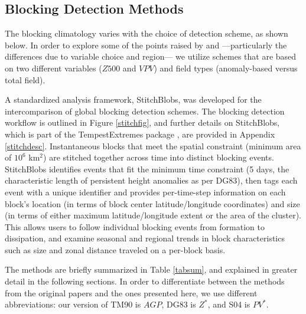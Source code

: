 \documentclass[smallextended]{svjour3}       %
\numberwithin{equation}{section}
\begin{document}
\subsection{Blocking Detection Methods}\label{detectionmethods}


The blocking climatology varies with the choice of detection scheme, as shown below. In order to explore some of the points raised by \cite{davini_bidimensional_2012} and \cite{scherrer_two-dimensional_2006}---particularly the differences due to variable choice and region--- we utilize schemes that are based on two different variables ($Z500$ and $VPV$) and field types (anomaly-based versus total field). 

A standardized analysis framework, StitchBlobs, was developed for the intercomparison of global blocking detection schemes. The blocking detection workflow is outlined in Figure \ref{stitchfig}, and further details on StitchBlobs, which is part of the TempestExtremes package \citep{ullrich_tempestextremes:_2017}, are provided in Appendix \ref{stitchdesc}. Instantaneous blocks that meet the spatial constraint (minimum area of $10^6$ km$^2$) are stitched together across time into distinct blocking events. StitchBlobs identifies events that fit the minimum time constraint (5 days, the characteristic length of persistent height anomalies as per DG83), then tags each event with a unique identifier and provides per-time-step information on each block's location (in terms of block center latitude/longitude coordinates) and size (in terms of either maximum latitude/longitude extent or the area of the cluster). This allows users to follow individual blocking events from formation to dissipation, and examine seasonal and regional trends in block characteristics such as size and zonal distance traveled on a per-block basis. 

The methods are briefly summarized in Table \ref{tabsum}, and explained in greater detail in the following sections. In order to differentiate between the methods from the original papers and the ones presented here, we use different abbreviations: our version of TM90 is $AGP$, DG83 is $Z^*$, and S04 is $PV^*$. 
\end{document}
